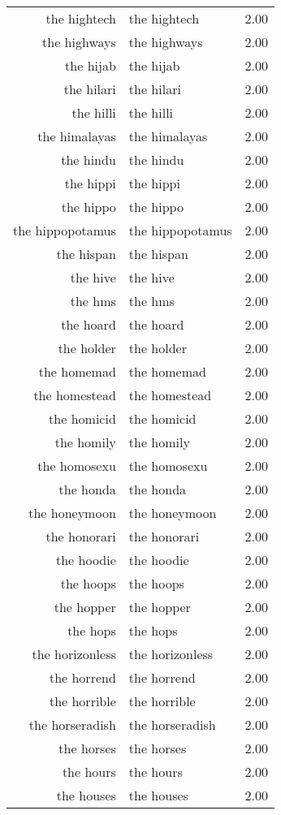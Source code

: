 \begin{table}[ht]
\begin{tabular}{rlr}
  the hightech & the hightech & 2.00 \\ 
  the highways & the highways & 2.00 \\ 
  the hijab & the hijab & 2.00 \\ 
  the hilari & the hilari & 2.00 \\ 
  the hilli & the hilli & 2.00 \\ 
  the himalayas & the himalayas & 2.00 \\ 
  the hindu & the hindu & 2.00 \\ 
  the hippi & the hippi & 2.00 \\ 
  the hippo & the hippo & 2.00 \\ 
  the hippopotamus & the hippopotamus & 2.00 \\ 
  the hispan & the hispan & 2.00 \\ 
  the hive & the hive & 2.00 \\ 
  the hms & the hms & 2.00 \\ 
  the hoard & the hoard & 2.00 \\ 
  the holder & the holder & 2.00 \\ 
  the homemad & the homemad & 2.00 \\ 
  the homestead & the homestead & 2.00 \\ 
  the homicid & the homicid & 2.00 \\ 
  the homily & the homily & 2.00 \\ 
  the homosexu & the homosexu & 2.00 \\ 
  the honda & the honda & 2.00 \\ 
  the honeymoon & the honeymoon & 2.00 \\ 
  the honorari & the honorari & 2.00 \\ 
  the hoodie & the hoodie & 2.00 \\ 
  the hoops & the hoops & 2.00 \\ 
  the hopper & the hopper & 2.00 \\ 
  the hops & the hops & 2.00 \\ 
  the horizonless & the horizonless & 2.00 \\ 
  the horrend & the horrend & 2.00 \\ 
  the horrible & the horrible & 2.00 \\ 
  the horseradish & the horseradish & 2.00 \\ 
  the horses & the horses & 2.00 \\ 
  the hours & the hours & 2.00 \\ 
  the houses & the houses & 2.00 \\ 

\end{tabular}
\end{table}
